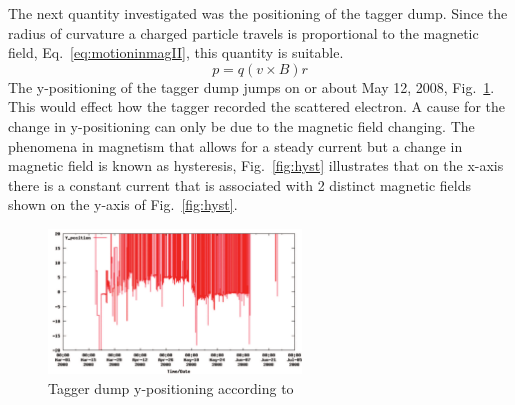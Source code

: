 
The next quantity investigated was the positioning of the tagger dump. Since the radius of curvature a charged particle travels is proportional to the magnetic field, Eq.~\ref{eq:motioninmagII}, this quantity is suitable.
\begin{equation}\label{eq:motioninmagII}
    p = q(v \times B)r
\end{equation}
The y-positioning of the tagger dump jumps on or about May 12, 2008, Fig.~\ref{fig:tagdump}. This would effect how the tagger recorded the scattered electron. A cause for the change in y-positioning can only be due to the magnetic field changing. The phenomena in magnetism that allows for a steady current but a change in magnetic field is known as hysteresis, Fig.~\ref{fig:hyst} illustrates that on the x-axis there is a constant current that is associated with 2 distinct magnetic fields shown on the y-axis of Fig.~\ref{fig:hyst}.
\begin{figure}\begin{center}
\includegraphics[width=0.6\textwidth]{figures/calib/tag/ecor/600px-Tagger-dump-y.pdf}
\caption[Tagger Dump Y-Positioning]{\label{fig:tagdump}Tagger dump y-positioning according to }
\end{center}\end{figure}

